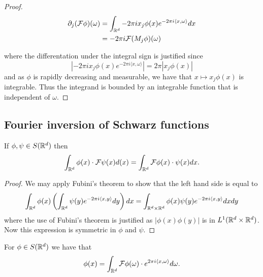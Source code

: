 \documentclass[twoside, a4paper, 10pt]{amsart}
\begin{document}
\begin{proof}
\begin{align*} \partial_j (\mathcal{F} \phi)(\omega)  &= \int_{\mathbb{R}^d} -2\pi i x_j \phi(x) e^{-2\pi i \langle x, \omega \rangle} dx \\
&= -2\pi i \mathcal{F}(M_j\phi)(\omega) \end{align*}

where the differentation under the integral sign is justified since $$|-2\pi i x_j \phi(x) e^{-2\pi i \langle x, \omega \rangle}| = 2\pi  |x_j \phi(x)|$$ and as $\phi$ is rapidly decreasing and measurable, we have that $x \mapsto x_j \phi(x)$ is integrable. Thus the integrand is bounded by an integrable function that is independent of $\omega$. \end{proof}


\subsection{Fourier inversion of Schwarz functions}

\begin{thm} If $\phi, \psi \in S(\mathbb{R}^d)$ then $$\int_{\mathbb{R}^d} \phi(x) \cdot \mathcal{F} \psi(x) d(x) = \int_{\mathbb{R}^d} \mathcal{F} \phi (x) \cdot \psi(x) dx.$$

\end{thm}

\begin{proof} We may apply Fubini's theorem to show that the left hand side is equal to $$\int_{\mathbb{R}^d} \phi(x) \left(\int_{\mathbb{R}^d} \psi(y) e^{-2\pi i \langle x, y \rangle } dy \right) dx = \int_{\mathbb{R}^d \times \mathbb{R}^d} \phi(x) \psi(y) e^{-2\pi i \langle x, y \rangle } dx dy  $$ where the use of Fubini's theorem is justified as $|\phi(x)\phi(y)|$ is in $L^1(\mathbb{R}^d \times \mathbb{R}^d)$. Now this expression is symmetric in $\phi$ and $\psi$. \end{proof}

\begin{thm} For $\phi \in S(\mathbb{R}^d)$ we have that $$\phi(x) = \int_{\mathbb{R}^d} \mathcal{F}\phi (\omega) \cdot e^{2\pi i \langle x , \omega \rangle } d\omega.$$

\end{thm}
\end{document}
